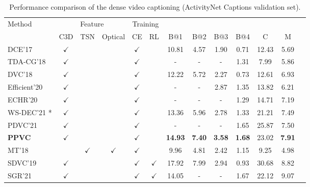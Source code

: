 \begin{table}
  \centering
  \caption{
    Performance comparison of the dense video captioning (ActivityNet Captions validation set).
  }
  \begin{tabular}{@{}l|ccc|cc|ccccccc@{}}
    \hline
    \multirow{2}{*}{Method} & \multicolumn{3}{|c|}{Feature} & \multicolumn{2}{|c|}{Training} \\
     & C3D & TSN & Optical & CE & RL & B@1 & B@2 & B@3 & B@4 & C & M\\
     \hline
    DCE'17 \cite{krishna2017dense}        & $\checkmark$ & & & $\checkmark$ & & 10.81 & 4.57  & 1.90  & 0.71 & 12.43 & 5.69\\
    TDA-CG'18 \cite{wang2018bidirectional} & $\checkmark$ & & & $\checkmark$ & & -     & -     & -     & 1.31  & 7.99 & 5.86\\
    DVC'18 \cite{li2018jointly}            & $\checkmark$ & & & $\checkmark$ & & 12.22 & 5.72  & 2.27  & 0.73 & 12.61 & 6.93\\
    Efficient'20 \cite{suin2020efficient}  & $\checkmark$ & & & $\checkmark$ & & -     & -     & 2.87  & 1.35 & 13.82 & 6.21\\
    ECHR'20 \cite{wang2020event}           & $\checkmark$ & & & $\checkmark$ & & -     & -     & -     & 1.29 & 14.71 & 7.19\\
    WS-DEC'21 \cite{chen2021towards}*      & $\checkmark$ & & & $\checkmark$ & & 13.36 & 5.96  & 2.78  & 1.33 & 21.21 & 7.49\\
    PDVC'21 \cite{wang2021end}             & $\checkmark$ & & & $\checkmark$ & & -     & -     & -     & 1.65 & 25.87 & 7.50 \\
    \textbf{PPVC}                       & $\checkmark$ & & & $\checkmark$ & & \textbf{14.93} & \textbf{7.40}  & \textbf{3.58}  & \textbf{1.68} & 23.02 & \textbf{7.91} \\
    \hline
    MT'18 \cite{zhou2018end} & & $\checkmark$ & $\checkmark$ & $\checkmark$   & & 9.96 & 4.81 & 2.42 & 1.15 & 9.25 & 4.98 \\
    SDVC'19 \cite{mun2019streamlined} & $\checkmark$ & & & $\checkmark$ & $\checkmark$ & 17.92 & 7.99 & 2.94 & 0.93 & 30.68 & 8.82 \\
    SGR'21 \cite{deng2021sketch} & $\checkmark$ & & & $\checkmark$ & $\checkmark$ & 14.05 & - & - & 1.67 & 22.12 & 9.07 \\
    \hline
  \end{tabular}
  \label{tab:eval_captioner}
\end{table}

